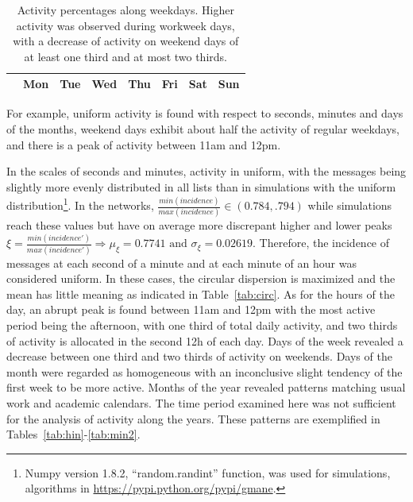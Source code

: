 \documentclass[%
	aip,
	jmp,%
	amsmath,amssymb,
	reprint,%
]{revtex4-1}
\begin{document}
\begin{table}
	\caption{Activity percentages along weekdays.
	Higher activity was observed during workweek days, with a decrease of activity on weekend days of at least one third and at most two thirds.}
	\begin{center}
		\begin{tabular}{ | l ||  c | c | c | c | c |   c | c |}
			\hline
			& Mon & Tue & Wed & Thu & Fri & Sat & Sun  \\ \hline
			
		\end{tabular}
	\end{center}
	\label{tab:win}
\end{table}
For example, uniform activity is found with respect to seconds, minutes and days of the months,
weekend days exhibit about half the activity of regular weekdays,
and there is a peak of activity between 11am and 12pm.

In the scales of seconds and minutes, activity in uniform,
with the messages being slightly more evenly distributed in all lists than in simulations with the uniform distribution\footnote{Numpy version 1.8.2, ``random.randint'' function, was used for simulations, algorithms in \url{https://pypi.python.org/pypi/gmane}.}.
In the networks, $\frac{min(incidence)}{max(incidence)} \in (0.784,.794)$ while simulations reach these values but have on average more discrepant higher and lower peaks $\xi=\frac{min(incidence')}{max(incidence')} \Rightarrow \mu_\xi=0.7741 \text{ and } \sigma_\xi=0.02619$.
Therefore, the incidence of messages at each second of a minute and at each minute of an hour was considered uniform.
In these cases, the circular dispersion is maximized and the mean has little meaning as indicated in Table~\ref{tab:circ}.
As for the hours of the day, an abrupt peak is found between 11am and 12pm with the most active period being the afternoon, with one third of total daily activity, and two thirds of activity is allocated in the second 12h of each day.
Days of the week revealed a decrease between one third and two thirds of activity on weekends.
Days of the month were regarded as homogeneous with an inconclusive slight tendency of the first week to be more active.
Months of the year revealed patterns matching usual work and academic calendars.
The time period examined here was not sufficient for the analysis of activity along the years. These patterns are exemplified in Tables~\ref{tab:hin}-\ref{tab:min2}.


\FloatBarrier
\end{document}
